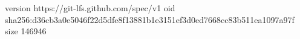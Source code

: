 version https://git-lfs.github.com/spec/v1
oid sha256:d36cb3a0e5046f22d5dfe8f13881b1e3151ef3d0ed7668cc83b511ea1097a97f
size 146946
